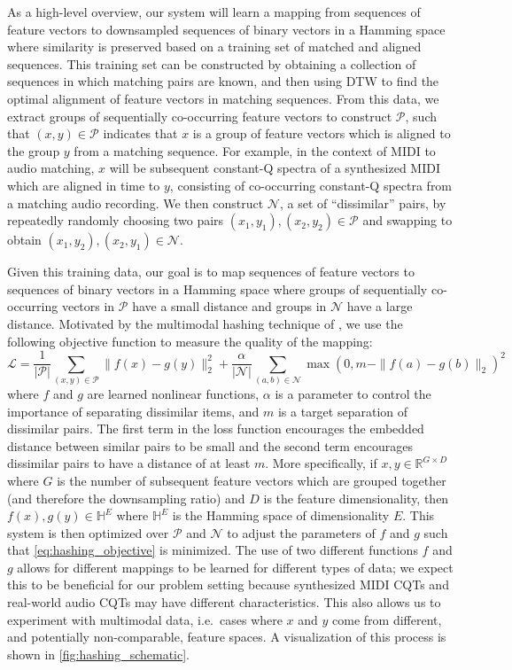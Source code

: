 As a high-level overview, our system will learn a mapping from sequences of feature vectors to downsampled sequences of binary vectors in a Hamming space where similarity is preserved based on a training set of matched and aligned sequences.
This training set can be constructed by obtaining a collection of sequences in which matching pairs are known, and then using DTW to find the optimal alignment of feature vectors in matching sequences.
From this data, we extract groups of sequentially co-occurring feature vectors to construct $\mathcal{P}$, such that $(x, y) \in \mathcal{P}$ indicates that $x$ is a group of feature vectors which is aligned to the group $y$ from a matching sequence.
For example, in the context of MIDI to audio matching, $x$ will be subsequent constant-Q spectra of a synthesized MIDI which are aligned in time to $y$, consisting of co-occurring constant-Q spectra from a matching audio recording.
We then construct $\mathcal{N}$, a set of ``dissimilar'' pairs, by repeatedly randomly choosing two pairs $(x_1, y_1), (x_2, y_2) \in \mathcal{P}$ and swapping to obtain $(x_1, y_2), (x_2, y_1) \in \mathcal{N}$.

Given this training data, our goal is to map sequences of feature vectors to sequences of binary vectors in a Hamming space where groups of sequentially co-occurring vectors in $\mathcal{P}$ have a small distance and groups in $\mathcal{N}$ have a large distance.
Motivated by the multimodal hashing technique of \cite{masci2014multimodal}, we use the following objective function to measure the quality of the mapping:
\begin{equation}
\mathcal{L} = \frac{1}{|\mathcal{P}|} \sum_{(x, y) \in \mathcal{P}} \| f(x) - g(y) \|_2^2  + \frac{\alpha}{|\mathcal{N}|} \sum_{(a, b) \in \mathcal{N}} \max(0, m - \|f(a) - g(b) \|_2)^2
\label{eq:hashing_objective}
\end{equation}
where $f$ and $g$ are learned nonlinear functions, $\alpha$ is a parameter to control the importance of separating dissimilar items, and $m$ is a target separation of dissimilar pairs.
The first term in the loss function encourages the embedded distance between similar pairs to be small and the second term encourages dissimilar pairs to have a distance of at least $m$.
More specifically, if $x, y \in \mathbb{R}^{G \times D}$ where $G$ is the number of subsequent feature vectors which are grouped together (and therefore the downsampling ratio) and $D$ is the feature dimensionality, then $f(x), g(y) \in \mathbb{H}^E$ where $\mathbb{H}^E$ is the Hamming space of dimensionality $E$.
This system is then optimized over $\mathcal{P}$ and $\mathcal{N}$ to adjust the parameters of $f$ and $g$ such that \cref{eq:hashing_objective} is minimized.
The use of two different functions $f$ and $g$ allows for different mappings to be learned for different types of data; we expect this to be beneficial for our problem setting because synthesized MIDI CQTs and real-world audio CQTs may have different characteristics.
This also allows us to experiment with multimodal data, i.e.\ cases where $x$ and $y$ come from different, and potentially non-comparable, feature spaces.
A visualization of this process is shown in \cref{fig:hashing_schematic}.

